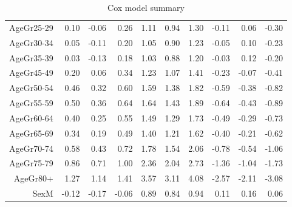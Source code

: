\begin{table}[ht]
\begin{tabular}{rrrrrrrrrr}
  AgeGr25-29 & 0.10 & -0.06 & 0.26 & 1.11 & 0.94 & 1.30 & -0.11 & 0.06 & -0.30 \\ 
  AgeGr30-34 & 0.05 & -0.11 & 0.20 & 1.05 & 0.90 & 1.23 & -0.05 & 0.10 & -0.23 \\ 
  AgeGr35-39 & 0.03 & -0.13 & 0.18 & 1.03 & 0.88 & 1.20 & -0.03 & 0.12 & -0.20 \\ 
  AgeGr45-49 & 0.20 & 0.06 & 0.34 & 1.23 & 1.07 & 1.41 & -0.23 & -0.07 & -0.41 \\ 
  AgeGr50-54 & 0.46 & 0.32 & 0.60 & 1.59 & 1.38 & 1.82 & -0.59 & -0.38 & -0.82 \\ 
  AgeGr55-59 & 0.50 & 0.36 & 0.64 & 1.64 & 1.43 & 1.89 & -0.64 & -0.43 & -0.89 \\ 
  AgeGr60-64 & 0.40 & 0.25 & 0.55 & 1.49 & 1.29 & 1.73 & -0.49 & -0.29 & -0.73 \\ 
  AgeGr65-69 & 0.34 & 0.19 & 0.49 & 1.40 & 1.21 & 1.62 & -0.40 & -0.21 & -0.62 \\ 
  AgeGr70-74 & 0.58 & 0.43 & 0.72 & 1.78 & 1.54 & 2.06 & -0.78 & -0.54 & -1.06 \\ 
  AgeGr75-79 & 0.86 & 0.71 & 1.00 & 2.36 & 2.04 & 2.73 & -1.36 & -1.04 & -1.73 \\ 
  AgeGr80+ & 1.27 & 1.14 & 1.41 & 3.57 & 3.11 & 4.08 & -2.57 & -2.11 & -3.08 \\ 
  SexM & -0.12 & -0.17 & -0.06 & 0.89 & 0.84 & 0.94 & 0.11 & 0.16 & 0.06 \\ 
   \hline
\end{tabular}
\caption{Cox model summary} 
\end{table}
